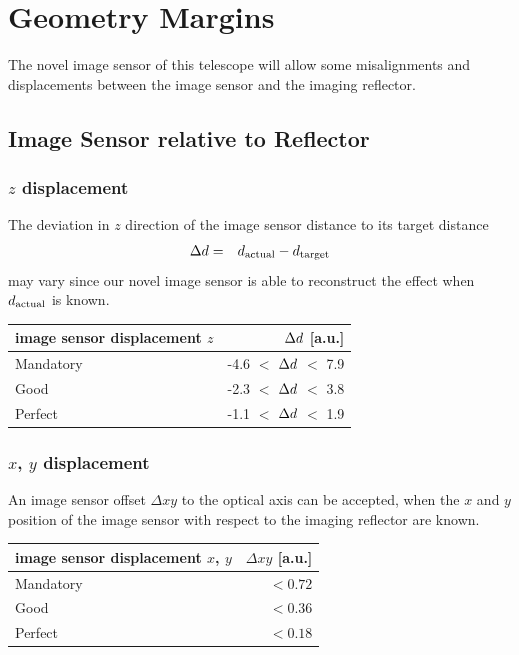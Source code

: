 \documentclass[11pt,a4paper,oneside,titlepage]{article}
\begin{document}
\section{Geometry Margins}
%
The novel image sensor of this telescope will allow some misalignments and displacements between the image sensor and the imaging reflector.
\subsection{Image Sensor relative to Reflector}
\subsubsection{$z$ displacement}
%
The deviation in $z$ direction of the image sensor distance to its target distance
%
\begin{eqnarray}
\Delta d & = & d_\text{actual} -d_\text{target}
\end{eqnarray}
%
may vary since our novel image sensor is able to reconstruct the effect when $d_\text{actual}$ is known.
%
%
\begin{table}[H]
    \begin{center}
        \begin{tabular}{lr}
            image sensor displacement $z$ & $\Delta d$ [a.u.]\\
            \toprule
            Mandatory & -4.6 $<$ $\Delta d$ $<$ 7.9\\
            Good      & -2.3 $<$ $\Delta d$ $<$ 3.8\\
            Perfect   & -1.1 $<$ $\Delta d$ $<$ 1.9\\
            \bottomrule
        \end{tabular}
    \end{center}
\end{table}
\subsubsection{$x$, $y$ displacement}
%
An image sensor offset $\Delta xy$ to the optical axis can be accepted, when the $x$ and $y$ position of the image sensor with respect to the imaging reflector are known.
%
%
\begin{table}[H]
    \begin{center}
        \begin{tabular}{lr}
            image sensor displacement $x$, $y$ & $\Delta xy$ [a.u.]\\
            \toprule
            Mandatory & $< 0.72$\\
            Good      & $< 0.36$\\
            Perfect   & $< 0.18$\\
            \bottomrule
        \end{tabular}
    \end{center}
\end{table}
\end{document}
